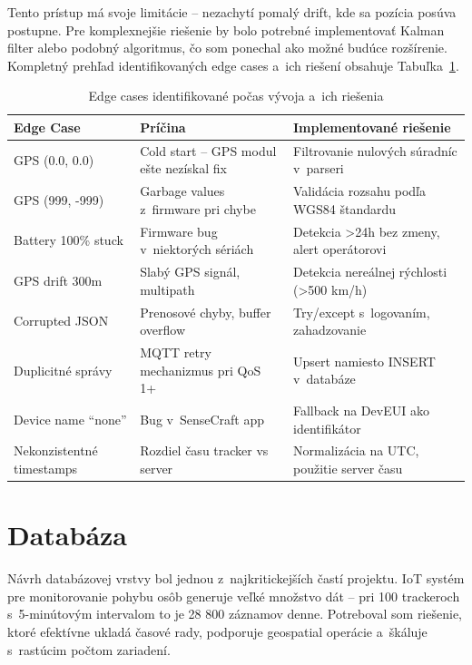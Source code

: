 Tento prístup má svoje limitácie -- nezachytí pomalý drift, kde sa pozícia posúva postupne. Pre komplexnejšie riešenie by bolo potrebné implementovať Kalman filter alebo podobný algoritmus, čo som ponechal ako možné budúce rozšírenie. Kompletný prehľad identifikovaných edge cases a~ich riešení obsahuje Tabuľka~\ref{tab:edgecases}.

\begin{table}[htbp]
    \centering
    \begin{tabular}{|p{3cm}|p{4cm}|p{5cm}|}
        \hline
        \textbf{Edge Case} & \textbf{Príčina} & \textbf{Implementované riešenie} \\
        \hline
        GPS (0.0, 0.0) & Cold start -- GPS modul ešte nezískal fix & Filtrovanie nulových súradníc v~parseri \\
        \hline
        GPS (999, -999) & Garbage values z~firmware pri chybe & Validácia rozsahu podľa WGS84 štandardu \\
        \hline
        Battery 100\% stuck & Firmware bug v~niektorých sériách & Detekcia >24h bez zmeny, alert operátorovi \\
        \hline
        GPS drift 300m & Slabý GPS signál, multipath & Detekcia nereálnej rýchlosti (>500 km/h) \\
        \hline
        Corrupted JSON & Prenosové chyby, buffer overflow & Try/except s~logovaním, zahadzovanie \\
        \hline
        Duplicitné správy & MQTT retry mechanizmus pri QoS 1+ & Upsert namiesto INSERT v~databáze \\
        \hline
        Device name ``none'' & Bug v~SenseCraft app & Fallback na DevEUI ako identifikátor \\
        \hline
        Nekonzistentné timestamps & Rozdiel času tracker vs server & Normalizácia na UTC, použitie server času \\
        \hline
    \end{tabular}
    \caption{Edge cases identifikované počas vývoja a~ich riešenia}
    \label{tab:edgecases}
\end{table}


\section{Databáza}
\label{sec:Databaze}

Návrh databázovej vrstvy bol jednou z~najkritickejších častí projektu. IoT systém pre monitorovanie pohybu osôb generuje veľké množstvo dát -- pri 100 trackeroch s~5-minútovým intervalom to je 28 800 záznamov denne. Potreboval som riešenie, ktoré efektívne ukladá časové rady, podporuje geospatial operácie a~škáluje s~rastúcim počtom zariadení.

